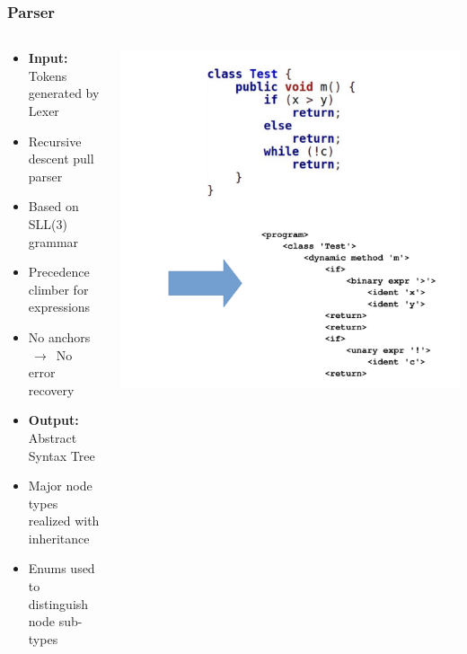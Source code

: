\documentclass[navbaroff,en]{sdqbeamer}
\begin{document}
\begin{frame}
	\frametitle{Parser}

	\begin{columns}
		\begin{column}{0.4\textwidth}
	\begin{itemize}
		\item \textbf{Input:} Tokens generated by Lexer
		\item Recursive descent pull parser
		\item Based on SLL(3) grammar
		\item Precedence climber for expressions
		\item No anchors $\,\longrightarrow\,$ No error recovery

		\vspace{1em}

		\item \textbf{Output:} Abstract Syntax Tree
		\item Major node types realized with inheritance
		\item Enums used to distinguish node sub-types
	\end{itemize}
	\end{column}

	\begin{column}{0.6\textwidth}
		\centering \includegraphics[scale=0.26]{images/ast_example.pdf}
    \end{column}
\end{columns}

\end{frame}
\end{document}
